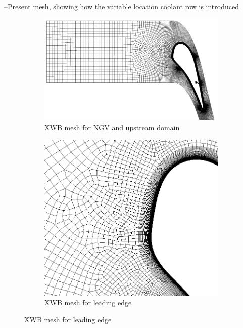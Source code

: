 \documentclass[a4paper, 11pt, twoside]{report}
\begin{document}
--Present mesh, showing how the variable location coolant row is introduced
\begin{figure}[H]
  \centering
  \begin{subfigure}{.9\textwidth}
    \centering
    \includegraphics[width=\linewidth]{figs/SCH_mesh_domain_placeholder.png}
    \caption{XWB mesh for NGV and upstream domain}
    \label{fig:SCH_mesh_1}
  \end{subfigure}
  \vspace{0.05\textwidth}
  \begin{subfigure}{.45\textwidth}
    \centering
    \includegraphics[width=\linewidth]{figs/SCH_mesh_leading_edge_placeholder.png}
    \caption{XWB mesh for leading edge}
    \label{fig:SCH_mesh_2}
  \end{subfigure}

\end{figure}
\end{document}

